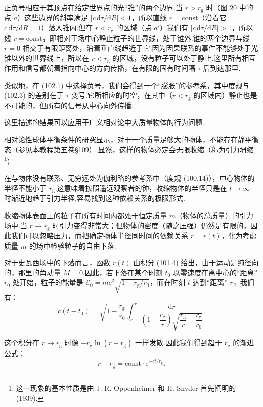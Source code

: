 正负号相应于其顶点在给定世界点的光“锥”的两个边界.当 $r>r_{\mathrm{g}}$ 时（图 20 中的点 $a$）这些边界的斜率满足 $|c\,\mathrm{d}\tau/\mathrm{d}R|<1$，所以直线 $r=\mathrm{const}$（沿着它 $c\,\mathrm{d}\tau/\mathrm{d}R=1$）落入锥内.但在 $r<r_{\mathrm{g}}$ 的区域（点 $a'$）我们有 $|c\,\mathrm{d}\tau/\mathrm{d}R|>1$，所以线 $r=\mathrm{const}$，即相对于场中心静止粒子的世界线，处于锥外.锥的两个边界与线 $r=0$ 相交于有限距离处，沿着垂直线趋近于它.因为因果联系的事件不能够处于光锥以外的世界线上，所以在 $r<r_{\mathrm{g}}$ 的区域，没有粒子可以处于静止.这里所有相互作用和信号都朝着指向中心的方向传播，在有限的固有时间隔 $\tau$ 后到达那里.

类似地，在 (102.1) 中选择负号，我们会得到一个“膨胀”的参考系，其中度规与 (102.3) 的差别在于 $\tau$ 变号.它所相应的时空，在其中（$r<r_{\mathrm{g}}$ 的区域内）静止也是不可能的，但所有的信号从中心向外传播.

这里描述的结果可以应用于广义相对论中大质量物体的行为问题.

相对论性球体平衡条件的研究显示，对于一个质量足够大的物体，不能存在静平衡态（参见本教程第五卷§109）.显然，这样的物体必定会无限收缩（称为引力坍缩\footnote{这一现象的基本性质是由 J. R. Oppenheimer 和 H. Snyder 首先阐明的 (1939).}）.

在与物体没有联系、无穷远处为伽利略的参考系中（度规 (100.14)），中心物体的半径不能小于 $r_{\mathrm{g}}$.这意味着按照遥远观察者的钟，收缩物体的半径只是在 $t\to\infty$ 时渐近地趋于引力半径.容易找到这种依赖关系的极限形式.

收缩物体表面上的粒子在所有时间内都处于恒定质量 $m$（物体的总质量）的引力场中.当 $r\to r_{\mathrm{g}}$ 时引力变得非常大；但物体的密度（随之压强）仍然是有限的，因此我们可以忽略压力，而把确定物体半径同时间的依赖关系 $r=r(t)$，化为考虑质量 $m$ 的场中检验粒子的自由下落.

对于史瓦西场中的下落而言，函数 $r(t)$ 由积分 (101.4) 给出，由于运动是纯径向的，那里的角动量 $M=0$.因此，若下落在某个时刻 $t_0$ 以零速度在离中心的“距离” $r_0$ 处开始，粒子的能量是 $\mathcal{E}_0=mc^{2}\sqrt{1-r_{\mathrm{g}}/r_0}$，而在时刻 $t$ 达到“距离” $r$，我们有：
\begin{equation}
  c(t-t_0)=\sqrt{1-\frac{r_{\mathrm{g}}}{r_0}}\int_{r}^{r_0}
  \frac{\mathrm{d}r}{\left(1-\dfrac{r_{\mathrm{g}}}{r}\right)
  \sqrt{\dfrac{r_{\mathrm{g}}}{r}-\dfrac{r_{\mathrm{g}}}{r_0}}}.
\end{equation}

这个积分在 $r\to r_{\mathrm{g}}$ 时像 $-r_{\mathrm{g}}\ln(r-r_{\mathrm{g}})$ 一样发散.因此我们得到趋于 $r_{\mathrm{g}}$ 的渐进公式：
\begin{equation}
  r-r_{\mathrm{g}}=\mathrm{const}\cdot\mathrm{e}^{-ct/r_{\mathrm{g}}}.
\end{equation}


